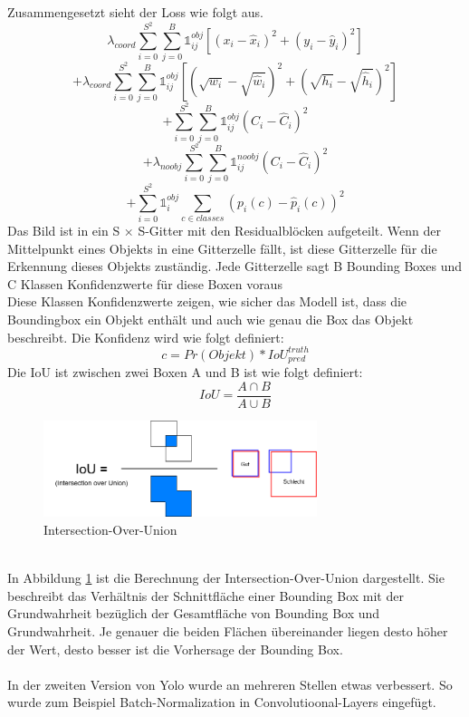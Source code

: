 \documentclass[conference]{IEEEtran}
\begin{document}
	Zusammengesetzt sieht der Loss wie folgt aus.
	\[ \lambda_{coord} \sum_{i=0}^{S^2}\sum_{j=0}^{B} \mathbb{1}_{i j}^{obj} [(x_i - \hat{x}_i )^2 + (y_i - \hat{y}_i )^2] \]
	\[ + \lambda_{coord} \sum_{i=0}^{S^2}\sum_{j=0}^{B} \mathbb{1}_{i j}^{obj} [(\sqrt{w_i} - \sqrt{\hat{w}_i} )^2 + (\sqrt{h_i} - \sqrt{\hat{h}_i} )^2] \]
	\[ + \sum_{i=0}^{S^2}\sum_{j=0}^{B} \mathbb{1}_{i j}^{obj} (C_i - \hat{C}_i)^2 \]
	\[ + \lambda_{noobj} \sum_{i=0}^{S^2}\sum_{j=0}^{B} \mathbb{1}_{i j}^{noobj} (C_i - \hat{C}_i)^2 \]
	\[ + \sum_{i=0}^{S^2} \mathbb{1}_{i}^{obj} \sum_{c \in classes} (p_i(c) - \hat{p}_i(c))^2 \]
	Das Bild ist in ein S × S-Gitter mit den Residualblöcken aufgeteilt. Wenn der Mittelpunkt eines Objekts in eine Gitterzelle fällt, ist diese Gitterzelle für die Erkennung dieses Objekts zuständig. Jede Gitterzelle sagt B Bounding Boxes und C Klassen Konfidenzwerte für diese Boxen voraus \cite{b1}\\
	Diese Klassen Konfidenzwerte zeigen, wie sicher das Modell ist, dass die Boundingbox ein Objekt enthält und auch wie genau die Box das Objekt beschreibt. Die Konfidenz wird wie folgt definiert:
	\[ c = Pr(Objekt) * IoU_{pred}^{truth} \]
	Die IoU ist zwischen zwei Boxen A und B ist wie folgt definiert:
	\[ IoU = \frac{A \cap B}{A \cup B} \]
	\begin{figure}[h]
		\begin{center}
			\includegraphics[width=8cm]{Media/Iou.png}
			\caption{Intersection-Over-Union}
			\label{IoU}
		\end{center}
	\end{figure}\\
	In Abbildung \ref{IoU} ist die Berechnung der Intersection-Over-Union dargestellt. Sie beschreibt das Verhältnis der Schnittfläche einer Bounding Box mit der Grundwahrheit bezüglich der Gesamtfläche von Bounding Box und Grundwahrheit. Je genauer die beiden Flächen übereinander liegen desto höher der Wert, desto besser ist die Vorhersage der Bounding Box.\\
	\\
	In der zweiten Version von Yolo wurde an mehreren Stellen etwas verbessert. So wurde zum Beispiel Batch-Normalization in Convolutioonal-Layers eingefügt.\\
\end{document}
